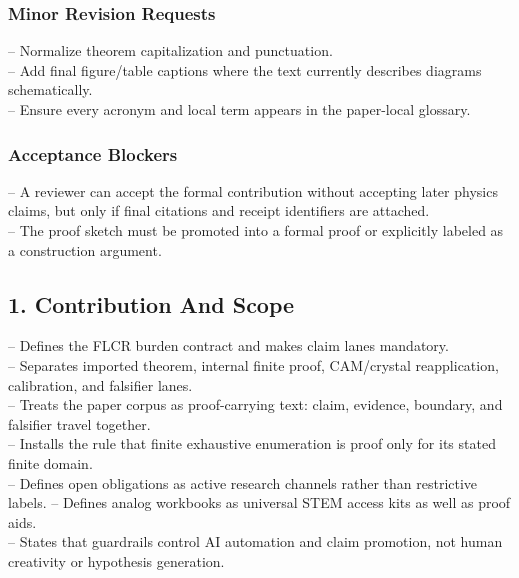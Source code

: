 \documentclass[11pt]{article}
\begin{document}
\subsubsection*{Minor Revision Requests}

\noindent{}-- Normalize theorem capitalization and punctuation.\\
\noindent{}-- Add final figure/table captions where the text currently describes diagrams schematically.\\
\noindent{}-- Ensure every acronym and local term appears in the paper-local glossary.\\

\subsubsection*{Acceptance Blockers}

\noindent{}-- A reviewer can accept the formal contribution without accepting later physics claims, but only if final citations and receipt identifiers are attached.\\
\noindent{}-- The proof sketch must be promoted into a formal proof or explicitly labeled as a construction argument.\\


\subsection*{1. Contribution And Scope}

\noindent{}-- Defines the FLCR burden contract and makes claim lanes mandatory.\\
\noindent{}-- Separates imported theorem, internal finite proof, CAM/crystal reapplication, calibration, and falsifier lanes.\\
\noindent{}-- Treats the paper corpus as proof-carrying text: claim, evidence, boundary, and falsifier travel together.\\
\noindent{}-- Installs the rule that finite exhaustive enumeration is proof only for its stated finite domain.\\

\noindent{}-- Defines open obligations as active research channels rather than restrictive\\
  labels.
\noindent{}-- Defines analog workbooks as universal STEM access kits as well as proof aids.\\
\noindent{}-- States that guardrails control AI automation and claim promotion, not human\\
  creativity or hypothesis generation.
\end{document}

